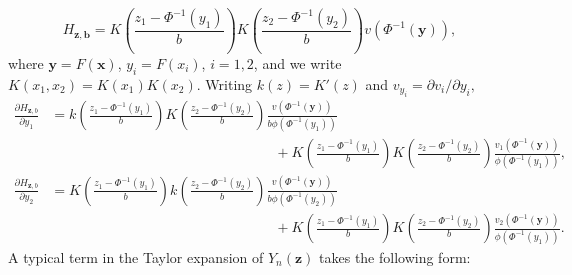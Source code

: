 \documentclass[
  12pt,
  letterpaper]{article}
\numberwithin{equation}{section}
\newcommand{\x}{\bm{x}}
\newcommand{\z}{\bm{z}}
\newcommand{\y}{\bm{y}}
\newcommand{\hh}{\bm{b}}
\begin{document}
\[H_{\z,\hh} = K\left(\frac{z_1 - \Phi^{-1}(y_1)}{b}\right)K\left(\frac{z_2 - \Phi^{-1}(y_2)}{b}\right)v(\Phi^{-1}(\y)),\]
where \(\y = F(\x)\), \(y_i = F(x_i)\), \(i=1,2\), and we write \(K(x_1,x_2) = K(x_1)K(x_2)\). Writing \(k(z) = K'(z)\) and \(v_{y_i} = \partial v_i/\partial y_i,\)
\begin{align*}
\frac{\partial H_{\bm{z},b}}{\partial y_1} 
&= k\left(\frac{z_1 - \Phi^{-1}(y_1)}{b}\right) K\left(\frac{z_2 - \Phi^{-1}(y_2)}{b}\right) \frac{v(\Phi^{-1}(\y))}{b\phi(\Phi^{-1}(y_1))} \\
& \qquad\qquad\qquad\qquad\qquad\qquad\qquad\qquad +  K\left(\frac{z_1 - \Phi^{-1}(y_1)}{b}\right) K\left(\frac{z_2 - \Phi^{-1}(y_2)}{b}\right) \frac{v_1(\Phi^{-1}(\y))}{\phi(\Phi^{-1}(y_1))}, \\
\frac{\partial H_{\bm{z},b}}{\partial y_2} 
&= K\left(\frac{z_1 - \Phi^{-1}(y_1)}{b}\right) k\left(\frac{z_2 - \Phi^{-1}(y_2)}{b}\right) \frac{v(\Phi^{-1}(\y))}{b\phi(\Phi^{-1}(y_2))} \\
& \qquad\qquad\qquad\qquad\qquad\qquad\qquad\qquad+  K\left(\frac{z_1 - \Phi^{-1}(y_1)}{b}\right) K\left(\frac{z_2 - \Phi^{-1}(y_2)}{b}\right) \frac{v_2(\Phi^{-1}(\y))}{\phi(\Phi^{-1}(y_1))}.
\end{align*}
A typical term in the Taylor expansion of \(Y_n(\z)\) takes the following form:
\end{document}
